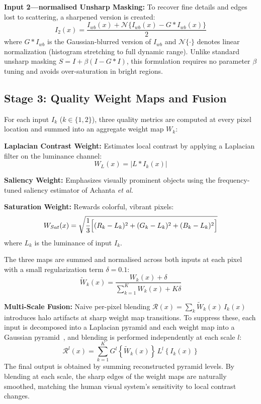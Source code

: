 \documentclass[10pt,twocolumn,letterpaper]{article}
\begin{document}
\textbf{Input 2---normalised Unsharp Masking:} To recover fine details
and edges lost to scattering, a sharpened version is created:
\begin{equation}
  I_2(x) = \frac{I_{wb}(x) + \mathcal{N}\{I_{wb}(x) - G * I_{wb}(x)\}}{2}
  \label{eq:sharpening}
\end{equation}
where $G * I_{wb}$ is the Gaussian-blurred version of $I_{wb}$ and
$\mathcal{N}\{\cdot\}$ denotes linear normalization (histogram stretching
to full dynamic range). Unlike standard unsharp masking $S = I + \beta(I -
G*I)$, this formulation requires no parameter $\beta$ tuning and avoids
over-saturation in bright regions.

\subsection{Stage 3: Quality Weight Maps and Fusion}

For each input $I_k$ ($k \in \{1,2\}$), three quality metrics are computed
at every pixel location and summed into an aggregate weight map $W_k$:

\textbf{Laplacian Contrast Weight:} Estimates local contrast by applying a
Laplacian filter on the luminance channel:
\begin{equation}
  W_L(x) = |L * I_k(x)|
  \label{eq:wl}
\end{equation}

\textbf{Saliency Weight:} Emphasizes visually prominent objects using the
frequency-tuned saliency estimator of Achanta \emph{et al.}

\textbf{Saturation Weight:} Rewards colorful, vibrant pixels:
\begin{equation}
  W_{Sat}(x) = \sqrt{\frac{1}{3} \Bigl[(R_k-L_k)^2 + (G_k-L_k)^2 + (B_k-L_k)^2\Bigr]}
  \label{eq:wsat}
\end{equation}
where $L_k$ is the luminance of input $I_k$.

The three maps are summed and normalised across both inputs at each pixel
with a small regularization term $\delta = 0.1$:
\begin{equation}
  \tilde{W}_k(x) = \frac{W_k(x) + \delta}{\sum_{k=1}^{K} W_k(x) + K\delta}
  \label{eq:norm_weight}
\end{equation}

\textbf{Multi-Scale Fusion:} Naive per-pixel blending
$\mathcal{R}(x) = \sum_k \tilde{W}_k(x)\,I_k(x)$ introduces halo
artifacts at sharp weight map transitions. To suppress these, each input
is decomposed into a Laplacian pyramid and each weight map into a
Gaussian pyramid~\cite{burt1983laplacian,mertens2009exposure}, and blending
is performed independently at each scale $l$:
\begin{equation}
  \mathcal{R}^l(x) = \sum_{k=1}^{K} G^l\!\left\{\tilde{W}_k(x)\right\}\,
  L^l\!\left\{I_k(x)\right\}
  \label{eq:fusion}
\end{equation}
The final output is obtained by summing reconstructed pyramid levels. By
blending at each scale, the sharp edges of the weight maps are naturally
smoothed, matching the human visual system's sensitivity to local contrast
changes.
\end{document}
